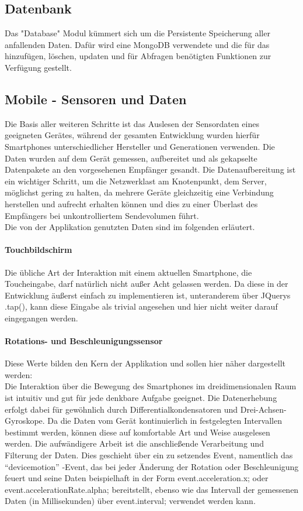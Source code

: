 \documentclass[a4paper]{spie}  %
\begin{document}
\subsection{Datenbank}
Das "Database" Modul kümmert sich um die Persistente Speicherung aller anfallenden Daten. Dafür wird eine MongoDB verwendete und die für das hinzufügen, löschen, updaten und für Abfragen benötigten Funktionen zur Verfügung gestellt.

\subsection{Mobile - Sensoren und Daten}
Die Basis aller weiteren Schritte ist das Auslesen der Sensordaten eines geeigneten Gerätes, während der gesamten Entwicklung wurden hierfür Smartphones unterschiedlicher Hersteller und Generationen verwenden. Die Daten wurden auf dem Gerät gemessen, aufbereitet und als gekapselte Datenpakete an den vorgesehenen Empfänger gesandt. Die Datenaufbereitung ist ein wichtiger Schritt, um die Netzwerklast am Knotenpunkt, dem Server, möglichst gering zu halten, da mehrere Geräte gleichzeitig eine Verbindung herstellen und aufrecht erhalten können und dies zu einer Überlast des Empfängers bei unkontrolliertem Sendevolumen führt.\\
Die von der Applikation genutzten Daten sind im folgenden erläutert.
\paragraph{Touchbildschirm}
Die übliche Art der Interaktion mit einem aktuellen Smartphone, die Toucheingabe, darf natürlich nicht außer Acht gelassen werden. Da diese in der Entwicklung äußerst einfach zu implementieren ist, unteranderem über JQuerys .tap(), kann diese Eingabe als trivial angesehen und hier nicht weiter darauf eingegangen werden.
\paragraph{Rotations- und Beschleunigungssensor}
Diese Werte bilden den Kern der Applikation und sollen hier näher dargestellt werden:\\
Die Interaktion über die Bewegung des Smartphones im dreidimensionalen Raum ist intuitiv und gut für jede denkbare Aufgabe geeignet. Die Datenerhebung erfolgt dabei für gewöhnlich durch Differentialkondensatoren und Drei-Achsen-Gyroskope.
Da die Daten vom Gerät kontinuierlich in festgelegten Intervallen bestimmt werden, können diese auf komfortable Art und Weise ausgelesen werden. Die aufwändigere Arbeit ist die anschließende Verarbeitung und Filterung der Daten. Dies geschieht über ein zu setzendes Event, namentlich das \enquote{devicemotion} -Event, das bei jeder Änderung der Rotation oder Beschleunigung feuert und seine Daten beispielhaft in der Form event.acceleration.x; oder event.accelerationRate.alpha; bereitstellt, ebenso wie das Intervall der gemessenen Daten (in Millisekunden) über event.interval; verwendet werden kann.
\end{document}
